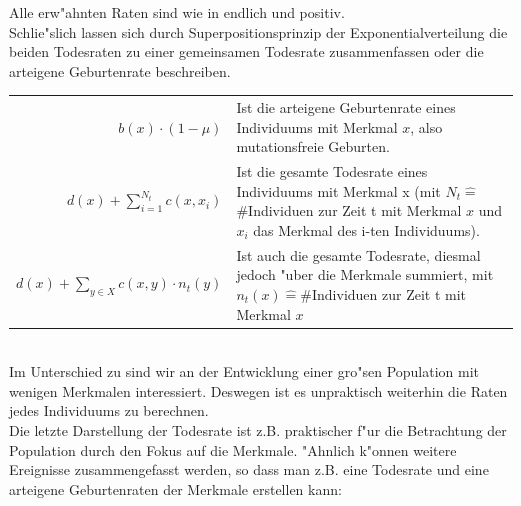 \documentclass[11pt, a4paper, german]{article}
\theoremstyle{plain}
\begin{document}
	Alle erw"ahnten Raten sind wie in \cite{fournier2004microscopic} endlich und positiv. \\
	Schlie"slich lassen sich durch Superpositionsprinzip der Exponentialverteilung die beiden Todesraten zu einer gemeinsamen Todesrate zusammenfassen oder die arteigene Geburtenrate beschreiben.\\
	
	\begin{tabular}{ r p{18em} }
		$ b(x) \cdot (1 - \mu) $ & Ist die arteigene Geburtenrate eines Individuums mit Merkmal $ x $, also mutationsfreie Geburten.\\
		$ d(x) + \sum_{i=1}^{N_t} c(x, x_i) $ & Ist die gesamte Todesrate eines Individuums mit Merkmal x (mit $ N_t \hat{=} $ \#Individuen zur Zeit t mit Merkmal $ x $ und $ x_i $ das Merkmal des i-ten Individuums).\\
		$ d(x) + \sum_{y \in X} c(x,y) \cdot n_t(y) $ & Ist auch die gesamte Todesrate, diesmal jedoch "uber die Merkmale summiert, mit $ n_t(x) \hat{=} \text{\#Individuen}$ zur Zeit t mit Merkmal $ x $
	\end{tabular}\\
	
	Im Unterschied zu \cite{Champagnat20061127} sind wir an der Entwicklung einer gro"sen Population mit wenigen Merkmalen interessiert. Deswegen ist es unpraktisch weiterhin die Raten jedes Individuums zu berechnen.\\
	Die letzte Darstellung der Todesrate ist z.B. praktischer f"ur die Betrachtung der Population durch den Fokus auf die Merkmale. "Ahnlich k"onnen weitere Ereignisse zusammengefasst werden, so dass man z.B. eine Todesrate und eine arteigene Geburtenraten der Merkmale erstellen kann:
	
\end{document}
